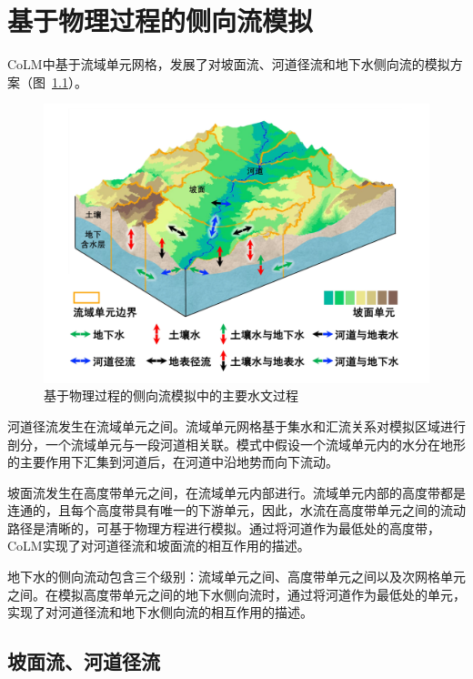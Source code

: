 \chapter{基于物理过程的侧向流模拟}\label{ch:侧向流模拟}

CoLM中基于流域单元网格，发展了对坡面流、河道径流和地下水侧向流的模拟方案（图~\ref{fig:主要水文过程}）。

{
  \begin{figure}[htbp]
    \centering
    \includegraphics[width=\textwidth]{Figures/侧向流/主要水文过程.jpg}
    \caption{基于物理过程的侧向流模拟中的主要水文过程}
    \label{fig:主要水文过程}
  \end{figure}
}

河道径流发生在流域单元之间。流域单元网格基于集水和汇流关系对模拟区域进行剖分，一个流域单元与一段河道相关联。模式中假设一个流域单元内的水分在地形的主要作用下汇集到河道后，在河道中沿地势而向下流动。

坡面流发生在高度带单元之间，在流域单元内部进行。流域单元内部的高度带都是连通的，且每个高度带具有唯一的下游单元，因此，水流在高度带单元之间的流动路径是清晰的，可基于物理方程进行模拟。通过将河道作为最低处的高度带，CoLM实现了对河道径流和坡面流的相互作用的描述。

地下水的侧向流动包含三个级别：流域单元之间、高度带单元之间以及次网格单元之间。在模拟高度带单元之间的地下水侧向流时，通过将河道作为最低处的单元，实现了对河道径流和地下水侧向流的相互作用的描述。

\section{坡面流、河道径流}

